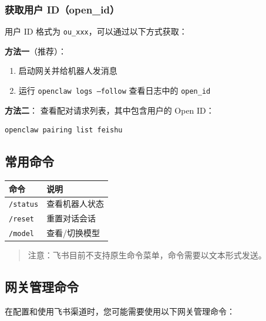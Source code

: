\subsubsection{获取用户 ID（open\_id）}


用户 ID 格式为 \texttt{ou\_xxx}，可以通过以下方式获取：

\textbf{方法一}（推荐）：

\begin{enumerate}
  \item 启动网关并给机器人发消息
  \item 运行 \texttt{openclaw logs --follow} 查看日志中的 \texttt{open\_id}
\end{enumerate}


\textbf{方法二}：
查看配对请求列表，其中包含用户的 Open ID：

\begin{lstlisting}[language=bash]
openclaw pairing list feishu
\end{lstlisting}


\hrulefill


\subsection{常用命令}



\begin{table}[h]
\centering
\small
\begin{tabular}{|l|l|}
\hline
命令 & 说明 \\
\hline
\texttt{/status} & 查看机器人状态 \\
\hline
\texttt{/reset} & 重置对话会话 \\
\hline
\texttt{/model} & 查看/切换模型 \\
\hline
\end{tabular}
\end{table}



\begin{quote}
注意：飞书目前不支持原生命令菜单，命令需要以文本形式发送。
\end{quote}


\subsection{网关管理命令}


在配置和使用飞书渠道时，您可能需要使用以下网关管理命令：



